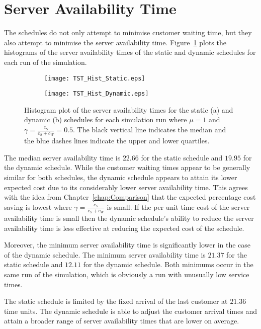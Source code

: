 \section{Server Availability Time}
The schedules do not only attempt to minimise customer waiting time, but they also attempt to minimise the server availability time. Figure~\ref{fig:Two_Server} plots the histograms of the server availability times of the static and dynamic schedules for each run of the simulation.
\begin{figure}[htb]
	\centering
	\begin{subfigure}[t]{0.45\textwidth}
		\centering
		\texttt{[image: TST\_Hist\_Static.eps]}
		\caption{}
	\end{subfigure}
	\begin{subfigure}[t]{0.45\textwidth}
		\centering
		\texttt{[image: TST\_Hist\_Dynamic.eps]}
		\caption{}
	\end{subfigure}
	\caption{Histogram plot of the server availability times for the static (a) and dynamic (b) schedules for each simulation run where $\mu = 1$ and $\gamma = \frac{c_{S}}{c_{S} + c_{W}} = 0.5$. The black vertical line indicates the median and the blue dashes lines indicate the upper and lower quartiles.}
	\label{fig:Two_Server}
\end{figure}

The median server availability time is $22.66$ for the static schedule and $19.95$ for the dynamic schedule. While the customer waiting times appear to be generally similar for both schedules, the dynamic schedule appears to attain its lower expected cost due to its considerably lower server availability time. This agrees with the idea from Chapter~\ref{chap:Comparison} that the expected percentage cost saving is lowest where $\gamma = \frac{c_{S}}{c_{S} + c_{W}}$ is small. If the per unit time cost of the server availability time is small then the dynamic schedule's ability to reduce the server availability time is less effective at reducing the expected cost of the schedule.

Moreover, the minimum server availability time is significantly lower in the case of the dynamic schedule. The minimum server availability time is $21.37$ for the static schedule and $12.11$ for the dynamic schedule. Both minimums occur in the same run of the simulation, which is obviously a run with unusually low service times.

The static schedule is limited by the fixed arrival of the last customer at $21.36$ time units. The dynamic schedule is able to adjust the customer arrival times and attain a broader range of server availability times that are lower on average.